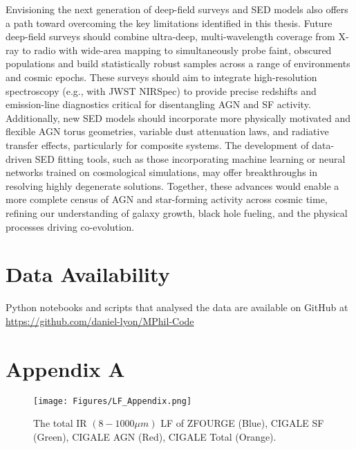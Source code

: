 Envisioning the next generation of deep-field surveys and SED models also offers a path toward overcoming the key limitations identified in this thesis. Future deep-field surveys should combine ultra-deep, multi-wavelength coverage from X-ray to radio with wide-area mapping to simultaneously probe faint, obscured populations and build statistically robust samples across a range of environments and cosmic epochs. These surveys should aim to integrate high-resolution spectroscopy (e.g., with JWST NIRSpec) to provide precise redshifts and emission-line diagnostics critical for disentangling AGN and SF activity. Additionally, new SED models should incorporate more physically motivated and flexible AGN torus geometries, variable dust attenuation laws, and radiative transfer effects, particularly for composite systems. The development of data-driven SED fitting tools, such as those incorporating machine learning or neural networks trained on cosmological simulations, may offer breakthroughs in resolving highly degenerate solutions. Together, these advances would enable a more complete census of AGN and star-forming activity across cosmic time, refining our understanding of galaxy growth, black hole fueling, and the physical processes driving co-evolution.

\section*{Data Availability}
Python notebooks and scripts that analysed the data are available on GitHub at \url{https://github.com/daniel-lyon/MPhil-Code}

\newpage
\section*{Appendix A} \label{Sec: Appendix}

\begin{figure}[h!]
    \texttt{[image: Figures/LF\_Appendix.png]}
    \caption*{The total IR $(8-1000\mu m)$ LF of ZFOURGE (Blue), CIGALE SF (Green), CIGALE AGN (Red), CIGALE Total (Orange).}
    \label{Fig: Appendix LF}
\end{figure}